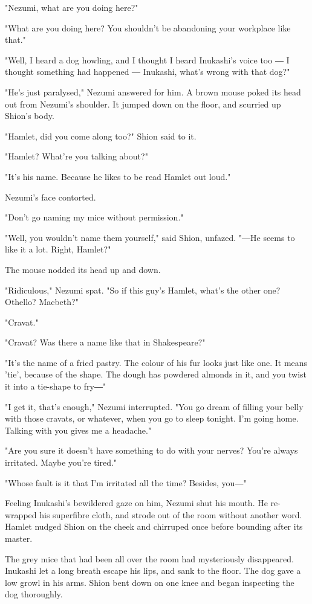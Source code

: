 "Nezumi, what are you doing here?"

"What are you doing here? You shouldn't be abandoning your workplace
like that."

"Well, I heard a dog howling, and I thought I heard Inukashi's voice too
― I thought something had happened ― Inukashi, what's wrong with that
dog?"

"He's just paralysed," Nezumi answered for him. A brown mouse poked its
head out from Nezumi's shoulder. It jumped down on the floor, and
scurried up Shion's body.

"Hamlet, did you come along too?" Shion said to it.

"Hamlet? What're you talking about?"

"It's his name. Because he likes to be read Hamlet out loud."

Nezumi's face contorted.

"Don't go naming my mice without permission."

"Well, you wouldn't name them yourself," said Shion, unfazed. "―He seems
to like it a lot. Right, Hamlet?"

The mouse nodded its head up and down.

"Ridiculous," Nezumi spat. "So if this guy's Hamlet, what's the other
one? Othello? Macbeth?"

"Cravat."

"Cravat? Was there a name like that in Shakespeare?"

"It's the name of a fried pastry. The colour of his fur looks just like
one. It means 'tie', because of the shape. The dough has powdered
almonds in it, and you twist it into a tie-shape to fry―"

"I get it, that's enough," Nezumi interrupted. "You go dream of filling
your belly with those cravats, or whatever, when you go to sleep
tonight. I'm going home. Talking with you gives me a headache."

"Are you sure it doesn't have something to do with your nerves? You're
always irritated. Maybe you're tired."

"Whose fault is it that I'm irritated all the time? Besides, you―"

Feeling Inukashi's bewildered gaze on him, Nezumi shut his mouth. He
re-wrapped his superfibre cloth, and strode out of the room without
another word. Hamlet nudged Shion on the cheek and chirruped once before
bounding after its master.

The grey mice that had been all over the room had mysteriously
disappeared. Inukashi let a long breath escape his lips, and sank to the
floor. The dog gave a low growl in his arms. Shion bent down on one knee
and began inspecting the dog thoroughly.

